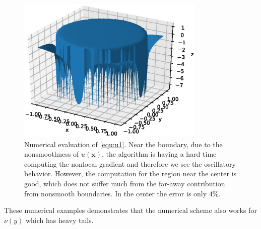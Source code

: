 \documentclass[10pt,a4paper]{article}
\newcommand{\bx}[0]{\mathbf{x}}
\theoremstyle{definition}
\begin{document}
\begin{figure}[H] %
\centering
\includegraphics[width=0.8\textwidth,keepaspectratio]{figures/fig8}
\caption{Numerical evaluation of \cref{equ:u1}. Near the boundary, due to the nonsmoothness of $u(\bx)$, the algorithm is having a hard time computing the nonlocal gradient and therefore we see the oscillatory behavior. However, the computation for the region near the center is  good, which does not suffer much from the far-away contribution from nonsmooth boundaries. In the center the error is only $4\%$.}
\label{fig:fig8}
\end{figure}

These numerical examples demonstrates that the numerical scheme also works for $\nu(y)$ which has heavy tails. 
\end{document}
